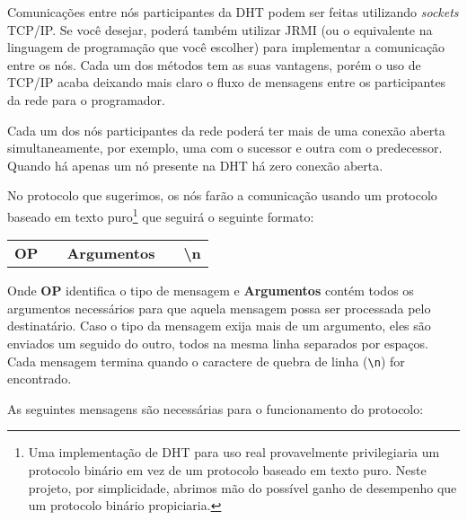 \documentclass[oneside,12pt,a4paper]{article}
\begin{document}
Comunicações entre nós participantes da DHT podem ser feitas
utilizando \emph{sockets} TCP/IP. Se você desejar, poderá também
utilizar JRMI (ou o equivalente na linguagem de programação que você
escolher) para implementar a comunicação entre os nós. Cada um dos
métodos tem as suas vantagens, porém o uso de TCP/IP acaba deixando mais
claro o fluxo de mensagens entre os participantes da rede para o
programador.

Cada um dos nós participantes da rede poderá ter mais de uma conexão
aberta simultaneamente, por exemplo, uma com o sucessor e outra com o
predecessor. Quando há apenas um nó presente na DHT há zero conexão
aberta.

No protocolo que sugerimos, os nós farão a comunicação usando um
protocolo baseado em texto puro\footnote{ Uma implementação de DHT
  para uso real provavelmente privilegiaria um protocolo binário em
  vez de um protocolo baseado em texto puro. Neste projeto, por
  simplicidade, abrimos mão do possível ganho de desempenho que um
  protocolo binário propiciaria.}  que seguirá o seguinte formato:

\begin{table}[h]
  \begin{tabular}{|l|l|l|l|l|}
    \cline{1-1} \cline{3-3} \cline{5-5}
    \textbf{OP} &  & \textbf{Argumentos} &  & \textbf{\textbackslash{}n} \\ \cline{1-1} \cline{3-3} \cline{5-5}
  \end{tabular}
\end{table}

Onde \textbf{OP} identifica o tipo de mensagem e \textbf{Argumentos}
contém todos os argumentos necessários para que aquela mensagem possa
ser processada pelo destinatário. Caso o tipo da mensagem exija mais
de um argumento, eles são enviados um seguido do outro, todos na mesma
linha separados por espaços. Cada mensagem termina quando o caractere
de quebra de linha (\texttt{\textbackslash{}n}) for encontrado.


As seguintes mensagens são necessárias para o funcionamento do
protocolo:
\end{document}
